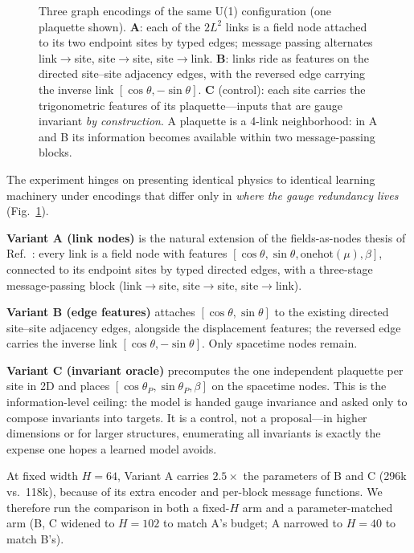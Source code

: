 \documentclass[aps,prd,twocolumn,superscriptaddress,nofootinbib]{revtex4-2}
\newcommand{\thetaP}{\ensuremath{\theta_P}}
\begin{document}
\begin{figure}[t]
\caption{Three graph encodings of the same U(1) configuration
(one plaquette shown). \textbf{A}: each of the $2L^2$ links is a field
node attached to its two endpoint sites by typed edges; message passing
alternates link$\to$site, site$\to$site, site$\to$link. \textbf{B}:
links ride as features on the directed site--site adjacency edges, with
the reversed edge carrying the inverse link $[\cos\theta,-\sin\theta]$.
\textbf{C} (control): each site carries the trigonometric features of
its plaquette---inputs that are gauge invariant \emph{by construction}.
A plaquette is a 4-link neighborhood: in A and B its information becomes
available within two message-passing blocks.}
\label{fig:variants}
\end{figure}

The experiment hinges on presenting identical physics to identical
learning machinery under encodings that differ only in \emph{where the
gauge redundancy lives} (Fig.~\ref{fig:variants}).

\textbf{Variant A (link nodes)} is the natural extension of the
fields-as-nodes thesis of Ref.~\cite{Brehm2026}: every link is a field
node with features $[\cos\theta, \sin\theta,
\mathrm{onehot}(\mu), \beta]$, connected to its endpoint sites by typed
directed edges, with a three-stage message-passing block
(link$\to$site, site$\to$site, site$\to$link).

\textbf{Variant B (edge features)} attaches $[\cos\theta, \sin\theta]$
to the existing directed site--site adjacency edges, alongside the
displacement features; the reversed edge carries the inverse link
$[\cos\theta, -\sin\theta]$. Only spacetime nodes remain.

\textbf{Variant C (invariant oracle)} precomputes the one independent
plaquette per site in 2D and places $[\cos\thetaP, \sin\thetaP, \beta]$
on the spacetime nodes. This is the information-level ceiling: the model
is handed gauge invariance and asked only to compose invariants into
targets. It is a control, not a proposal---in higher dimensions or for
larger structures, enumerating all invariants is exactly the expense one
hopes a learned model avoids.

At fixed width $H=64$, Variant A carries $2.5\times$ the parameters of
B and C (296k vs.\ 118k), because of its extra encoder and per-block
message functions. We therefore run the comparison in both a fixed-$H$
arm and a parameter-matched arm (B, C widened to $H=102$ to match A's
budget; A narrowed to $H=40$ to match B's).
\end{document}

